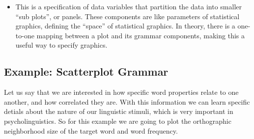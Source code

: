 \documentclass[]{book}
\newenvironment{Shaded}{\begin{snugshade}}{\end{snugshade}}
\newcommand{\KeywordTok}[1]{\textcolor[rgb]{0.13,0.29,0.53}{\textbf{#1}}}
\newcommand{\DataTypeTok}[1]{\textcolor[rgb]{0.13,0.29,0.53}{#1}}
\newcommand{\FloatTok}[1]{\textcolor[rgb]{0.00,0.00,0.81}{#1}}
\newcommand{\StringTok}[1]{\textcolor[rgb]{0.31,0.60,0.02}{#1}}
\newcommand{\CommentTok}[1]{\textcolor[rgb]{0.56,0.35,0.01}{\textit{#1}}}
\newcommand{\OperatorTok}[1]{\textcolor[rgb]{0.81,0.36,0.00}{\textbf{#1}}}
\newcommand{\NormalTok}[1]{#1}
\providecommand{\tightlist}{%
  \setlength{\itemsep}{0pt}\setlength{\parskip}{0pt}}
\begin{document}
\begin{itemize}
  \begin{itemize}
  \tightlist
  \item
    This is a specification of data variables that partition the data
    into smaller ``sub plots'', or panels. These components are like
    parameters of statistical graphics, defining the ``space'' of
    statistical graphics. In theory, there is a one-to-one mapping
    between a plot and its grammar components, making this a useful way
    to specify graphics.
  \end{itemize}
\end{itemize}

\subsection{Example: Scatterplot
Grammar}\label{example-scatterplot-grammar}

Let us say that we are interested in how specific word properties relate
to one another, and how correlated they are. With this information we
can learn specific detials about the nature of our linguistic stimuli,
which is very important in psycholinguistics. So for this example we are
going to plot the orthographic neighborhood size of the target word and
word frequency.

\begin{Shaded}
\end{Shaded}
\end{document}
